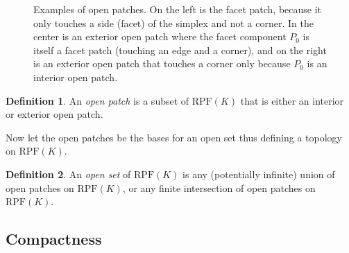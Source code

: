 \documentclass[twoside]{article}
\theoremstyle{plain}%
\theoremstyle{definition}
\newtheorem{definition}{Definition}[section]
\theoremstyle{remark}
\begin{document}
\begin{figure}[h]
{
}
\caption{Examples of open patches. On the left is the facet patch, because it only touches a side (facet) of the simplex and not a corner. In the center is an exterior open patch where the facet component \(P_0\) is itself a facet patch (touching an edge and a corner), and on the right is an exterior open patch that touches a corner only because \(P_0\) is an interior open patch.}
\label{fig:exterior_open_patch}
\end{figure}

\begin{definition}
An \textit{open patch} is a subset of \(\text{RPF}(K)\) that is either an interior or exterior open patch.
\end{definition}

Now let the open patches be the bases for an open set thus defining a topology on \(\text{RPF}(K)\).

\begin{definition}
An \textit{open set} of \(\text{RPF}(K)\) is any (potentially infinite) union of open patches on \(\text{RPF}(K)\), or any finite intersection of open patches on \(\text{RPF}(K)\).
\end{definition}

\subsection{Compactness}
\end{document}
